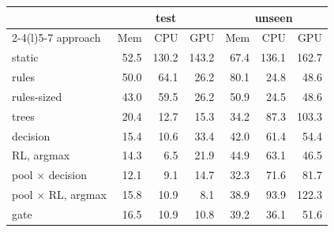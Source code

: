 \begin{tabular}{@{}lrrrrrr@{}}
\toprule
& \multicolumn{3}{c}{test} & \multicolumn{3}{c}{unseen} \\
\cmidrule(lr){2-4}\cmidrule(l){5-7}
approach & Mem & CPU & GPU & Mem & CPU & GPU \\
\midrule
static & 52.5 & 130.2 & 143.2 & 67.4 & 136.1 & 162.7 \\
rules & 50.0 & 64.1 & 26.2 & 80.1 & 24.8 & 48.6 \\
rules-sized & 43.0 & 59.5 & 26.2 & 50.9 & 24.5 & 48.6 \\
trees & 20.4 & 12.7 & 15.3 & 34.2 & 87.3 & 103.3 \\
decision & 15.4 & 10.6 & 33.4 & 42.0 & 61.4 & 54.4 \\
RL, argmax & 14.3 & 6.5 & 21.9 & 44.9 & 63.1 & 46.5 \\
pool $\times$ decision & 12.1 & 9.1 & 14.7 & 32.3 & 71.6 & 81.7 \\
pool $\times$ RL, argmax & 15.8 & 10.9 & 8.1 & 38.9 & 93.9 & 122.3 \\
gate & 16.5 & 10.9 & 10.8 & 39.2 & 36.1 & 51.6 \\
\bottomrule
\end{tabular}
